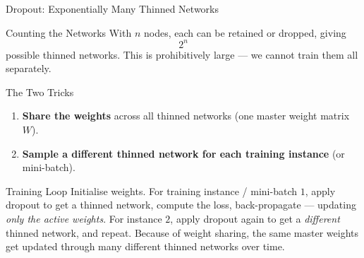 \documentclass{beamer}
\begin{document}
\begin{frame}[shrink=10]{Dropout: Exponentially Many Thinned Networks}
  \begin{block}{Counting the Networks}
    With $n$ nodes, each can be retained or dropped, giving
    \[
      \boxed{\,2^{n}\,}
    \]
    possible thinned networks. This is prohibitively large --- we cannot
    train them all separately.
  \end{block}

  \begin{block}{The Two Tricks}
    \begin{enumerate}\setlength\itemsep{3pt}
      \item \textbf{Share the weights} across all thinned networks (one
            master weight matrix $W$).
      \item \textbf{Sample a different thinned network for each training
            instance} (or mini-batch).
    \end{enumerate}
  \end{block}

  \begin{exampleblock}{Training Loop}
    Initialise weights. For training instance / mini-batch $1$, apply
    dropout to get a thinned network, compute the loss, back-propagate ---
    updating \emph{only the active weights}. For instance $2$, apply dropout
    again to get a \emph{different} thinned network, and repeat. Because of
    weight sharing, the same master weights get updated through many
    different thinned networks over time.
  \end{exampleblock}
\end{frame}
\end{document}
